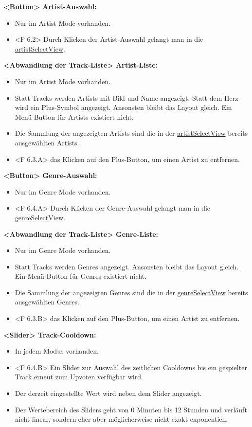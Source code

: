 \documentclass[oneside, ngerman]{sdqtechreport}
\begin{document}
\textbf{<Button> Artist-Auswahl:}
\begin{itemize}
    \item Nur im Artist Mode vorhanden.
    \item <F 6.2> Durch Klicken der Artist-Auswahl gelangt man in die \hyperlink{artistSelectView}{artistSelectView}.
\end{itemize}

\textbf{<Abwandlung der Track-Liste> Artist-Liste:}
\begin{itemize}
    \item Nur im Artist Mode vorhanden.
    \item Statt Tracks werden Artists mit Bild und Name angezeigt. Statt dem Herz wird ein Plus-Symbol angezeigt. Ansonsten bleibt das Layout gleich. Ein Menü-Button für Artists existiert nicht.
    \item Die Sammlung der angezeigten Artists sind die in der \hyperlink{artistSelectView}{artistSelectView} bereits ausgewählten Artists. 
    \item <F 6.3.A> das Klicken auf den Plus-Button, um einen Artist zu entfernen.
\end{itemize}

\textbf{<Button> Genre-Auswahl:}
\begin{itemize}
    \item Nur im Genre Mode vorhanden.
    \item <F 6.4.A> Durch Klicken der Genre-Auswahl gelangt man in die  \hyperlink{genreSelectView}{genreSelectView}.
\end{itemize}

\textbf{<Abwandlung der Track-Liste> Genre-Liste:}
\begin{itemize}
    \item Nur im Genre Mode vorhanden.
    \item Statt Tracks werden Genres angezeigt. Ansonsten bleibt das Layout gleich. Ein Menü-Button für Genres existiert nicht.
    \item Die Sammlung der angezeigten Genres sind die in der \hyperlink{genreSelectView}{genreSelectView} bereits ausgewählten Genres. 
    \item <F 6.3.B> das Klicken auf den Plus-Button, um einen Artist zu entfernen.
\end{itemize}

\textbf{<Slider> Track-Cooldown:}
\begin{itemize}
    \item In jedem Modus vorhanden.
    \item <F 6.4.B> Ein Slider zur Auswahl des zeitlichen Cooldowns bis ein gespielter Track erneut zum Upvoten verfügbar wird.
    \item Der derzeit eingestellte Wert wird neben dem Slider angezeigt.
    \item Der Wertebereich des Sliders geht von 0 Minuten bis 12 Stunden und verläuft nicht linear, sondern eher aber möglicherweise nicht exakt exponentiell.
\end{itemize}
\end{document}
